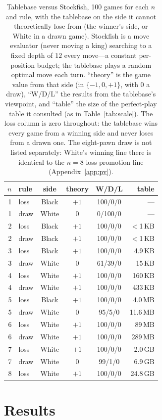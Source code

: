 \documentclass[11pt]{article}
\theoremstyle{plain}
\theoremstyle{definition}
\newcommand{\sfSevenLoss}{100/0/0}
\newcommand{\sfSevenDraw}{99/1/0}
\newcommand{\sfEightLoss}{100/0/0}
\begin{document}
\begin{table}[t]
\centering\small
\begin{tabular}{r l c c c r}
\toprule
$n$ & rule & side & theory & W/D/L & table\\
\midrule
1 & loss & Black & $+1$ & 100/0/0 & ---\\
1 & draw & White & $0$  & 0/100/0 & ---\\
2 & loss & Black & $+1$ & 100/0/0 & $<$1\,KB\\
2 & draw & Black & $+1$ & 100/0/0 & $<$1\,KB\\
3 & loss & Black & $+1$ & 100/0/0 & 4.9\,KB\\
3 & draw & White & $0$  & 61/39/0 & 15\,KB\\
4 & loss & White & $+1$ & 100/0/0 & 160\,KB\\
4 & draw & White & $+1$ & 100/0/0 & 433\,KB\\
5 & loss & Black & $+1$ & 100/0/0 & 4.0\,MB\\
5 & draw & White & $0$  & 95/5/0  & 11.6\,MB\\
6 & loss & White & $+1$ & 100/0/0 & 89\,MB\\
6 & draw & White & $+1$ & 100/0/0 & 289\,MB\\
7 & loss & White & $+1$ & \sfSevenLoss & 2.0\,GB\\
7 & draw & White & $0$  & \sfSevenDraw & 6.9\,GB\\
8 & loss & White & $+1$ & \sfEightLoss & 24.8\,GB\\
\bottomrule
\end{tabular}
\caption{Tablebase versus Stockfish, 100 games for each $n$ and rule, with the
tablebase on the side it cannot theoretically lose from (the winner's side, or
White in a drawn game). Stockfish is a move evaluator (never moving a king)
searching to a fixed depth of $12$ every move---a constant per-position budget;
the tablebase plays a random optimal move each turn. ``theory'' is the game value
from that side (in $\{-1,0,+1\}$, with $0$ a draw), ``W/D/L'' the results from the
tablebase's viewpoint, and
``table'' the size of the perfect-play table it consulted (as in
Table~\ref{tab:scale}). The loss column is zero throughout: the tablebase wins
every game from a winning side and never loses from a drawn one. The eight-pawn
draw is not listed separately: White's winning line there is identical to the
$n=8$ loss promotion line (Appendix~\ref{app:pv}).}
\label{tab:stockfish}
\end{table}

\section{Results}\label{sec:results}
\end{document}
